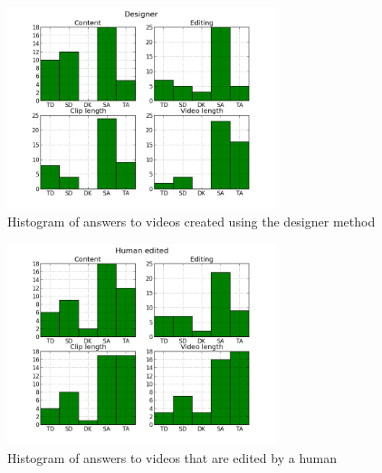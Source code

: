 %
\begin{figure}[!ht]
     \centering
     \includegraphics[width=0.7\textwidth]{img/designer_barplot.png}
     \caption{Histogram of answers to videos created using the designer method}\label{fig:hist_design}
\end{figure}
%
\begin{figure}[!ht]
     \centering
     \includegraphics[width=0.7\textwidth]{img/humanedited_barplot.png}
     \caption{Histogram of answers to videos that are edited by a human}\label{fig:hist_human}
\end{figure}
%
